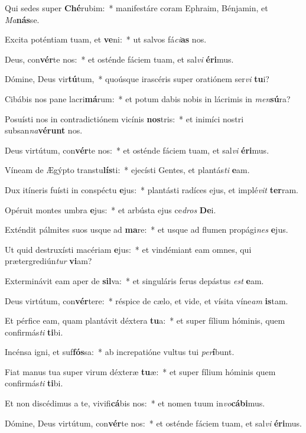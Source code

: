 \item Qui sedes super \textbf{Ché}rubim:~* manifestáre coram Ephraim, Bénjamin, et \textit{Ma}\textbf{nás}se.
\item Excita poténtiam tuam, et \textbf{ve}ni:~* ut salvos fá\textit{ci}\textbf{as} nos.
\item Deus, con\textbf{vér}te nos:~* et osténde fáciem tuam, et sal\textit{vi} \textbf{é}\textbf{ri}mus.
\item Dómine, Deus vir\textbf{tú}tum,~* quoúsque irascéris super oratiónem ser\textit{vi} \textbf{tu}i?
\item Cibábis nos pane lacri\textbf{má}rum:~* et potum dabis nobis in lácrimis in \textit{men}\textbf{sú}ra?
\item Posuísti nos in contradictiónem vicínis \textbf{nos}tris:~* et inimíci nostri subsan\textit{na}\textbf{vé}\textbf{runt} nos.
\item Deus virtútum, con\textbf{vér}te nos:~* et osténde fáciem tuam, et sal\textit{vi} \textbf{é}\textbf{ri}mus.
\item Víneam de Ægýpto transtu\textbf{lís}ti:~* ejecísti Gentes, et plantás\textit{ti} \textbf{e}am.
\item Dux itíneris fuísti in conspéctu \textbf{e}jus:~* plantásti radíces ejus, et implé\textit{vit} \textbf{ter}ram.
\item Opéruit montes umbra \textbf{e}jus:~* et arbústa ejus ce\textit{dros} \textbf{De}i.
\item Exténdit pálmites suos usque ad \textbf{ma}re:~* et usque ad flumen propági\textit{nes} \textbf{e}jus.
\item Ut quid destruxísti macériam \textbf{e}jus:~* et vindémiant eam omnes, qui prætergrediún\textit{tur} \textbf{vi}am?
\item Exterminávit eam aper de \textbf{sil}va:~* et singuláris ferus depástus \textit{est} \textbf{e}am.
\item Deus virtútum, con\textbf{vér}tere:~* réspice de cælo, et vide, et vísita víne\textit{am} \textbf{is}tam.
\item Et pérfice eam, quam plantávit déxtera \textbf{tu}a:~* et super fílium hóminis, quem confirmás\textit{ti} \textbf{ti}bi.
\item Incénsa igni, et suf\textbf{fós}sa:~* ab increpatióne vultus tui \textit{per}\textbf{í}bunt.
\item Fiat manus tua super virum déxteræ \textbf{tu}æ:~* et super fílium hóminis quem confirmás\textit{ti} \textbf{ti}bi.
\item Et non discédimus a te, vivifi\textbf{cá}bis nos:~* et nomen tuum in\textit{vo}\textbf{cá}\textbf{bi}mus.
\item Dómine, Deus virtútum, con\textbf{vér}te nos:~* et osténde fáciem tuam, et sal\textit{vi} \textbf{é}\textbf{ri}mus.
